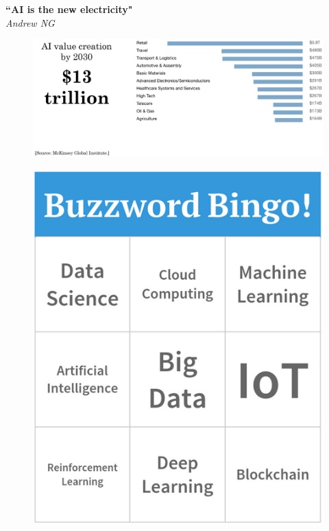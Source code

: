 \documentclass[10pt, compress]{beamer}
\begin{document}
\begin{frame}
  \vspace{.6cm}
  \textbf{``AI is the new electricity"} \\
  \qquad \qquad \qquad \small{\textit{Andrew NG}} \\

  \vspace{.6cm}
  \begin{figure}
    \includegraphics[width=1\linewidth]{imgs/ai_for_everyone_course/1}
  \end{figure}
\end{frame}

\begin{frame}
  \vspace{.4cm}

  \begin{figure}
    \includegraphics[width=.64\linewidth]{imgs/buzzwords}
  \end{figure}
\end{frame}
\end{document}

